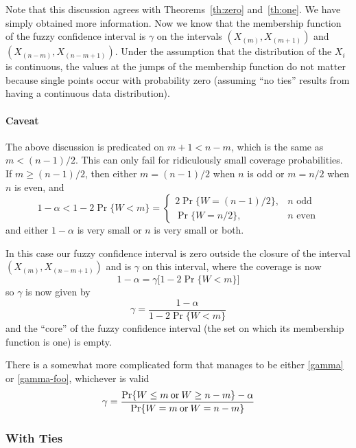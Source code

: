 \documentclass{article}
\newcommand{\opor}{\mathbin{\rm or}}
\begin{document}
Note that this discussion agrees with Theorems~\ref{th:zero} and~\ref{th:one}.
We have simply obtained more information.  Now we know that the membership
function of the fuzzy confidence interval is $\gamma$ on the intervals
$(X_{(m)}, X_{(m + 1)})$ and $(X_{(n - m)}, X_{(n - m + 1)})$.
Under the assumption that the distribution of the $X_i$ is continuous,
the values at the jumps of the membership function do not matter because
single points occur with probability zero (assuming ``no ties'' results
from having a continuous data distribution).

\paragraph{Caveat} The above discussion is predicated on $m + 1 < n - m$,
which is the same as $m < (n - 1) / 2$.  This can only fail for ridiculously
small coverage probabilities.  If $m \ge (n - 1) / 2$, then either
$m = (n - 1) / 2$ when $n$ is odd or $m = n / 2$ when $n$ is even, and
$$
   1 - \alpha < 1 - 2 \Pr\{ W < m \}
   =
   \begin{cases}
   2 \Pr\{ W = (n - 1) / 2 \}, & \text{$n$ odd}
   \\
   \Pr\{ W = n / 2 \}, & \text{$n$ even}
   \end{cases}
$$
and either $1 - \alpha$ is very small or $n$ is very small or both.

In this case our fuzzy confidence interval is zero outside the closure
of the interval $(X_{(m)}, X_{(n - m + 1)})$ and is $\gamma$ on this interval,
where the coverage is now
$$
   1 - \alpha = \gamma  \bigl[ 1 - 2 \Pr \{ W < m \} \bigr]
$$
so $\gamma$ is now given by
\begin{equation} \label{gamma-foo}
   \gamma
   =
   \frac{1 - \alpha}{1 - 2 \Pr \{ W < m \}}
\end{equation}
and the ``core'' of the fuzzy confidence interval (the set on which its
membership function is one) is empty.

There is a somewhat more complicated form that manages to be
either \eqref{gamma} or \eqref{gamma-foo}, whichever is valid
\begin{equation} \label{gamma-cool}
   \gamma
   =
   \frac{\Pr \{ W \le m \opor W \ge n - m \} - \alpha}
   {\Pr \{ W = m \opor W = n - m \}}
\end{equation}

\subsubsection{With Ties}
\end{document}
